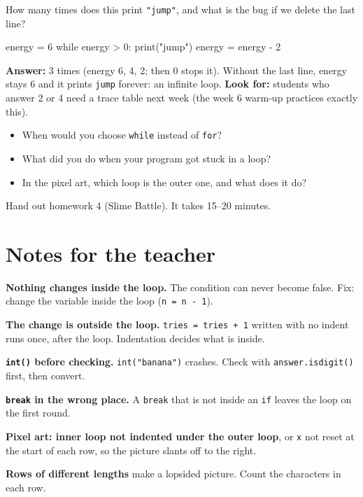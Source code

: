 \begin{formativecheck}
How many times does this print \texttt{"jump"}, and what is the bug if we delete the last line?
\begin{pycode}
energy = 6
while energy > 0:
    print("jump")
    energy = energy - 2
\end{pycode}
\textbf{Answer:} 3 times (energy 6, 4, 2; then 0 stops it). Without the last line, energy stays 6 and it prints \texttt{jump} forever: an infinite loop.
\textbf{Look for:} students who answer 2 or 4 need a trace table next week (the week 6 warm-up practices exactly this).
\end{formativecheck}

\begin{reflection}
\begin{itemize}[leftmargin=1.2em]
  \item When would you choose \texttt{while} instead of \texttt{for}?
  \item What did you do when your program got stuck in a loop?
  \item In the pixel art, which loop is the outer one, and what does it do?
\end{itemize}
\end{reflection}
Hand out homework 4 (Slime Battle). It takes 15--20 minutes.

\section{Notes for the teacher}
\begin{commonmistakes}
  \item \textbf{Nothing changes inside the loop.} The condition can never become false. Fix: change the variable inside the loop (\texttt{n = n - 1}).
  \item \textbf{The change is outside the loop.} \texttt{tries = tries + 1} written with no indent runs once, after the loop. Indentation decides what is inside.
  \item \textbf{\texttt{int()} before checking.} \texttt{int("banana")} crashes. Check with \texttt{answer.isdigit()} first, then convert.
  \item \textbf{\texttt{break} in the wrong place.} A \texttt{break} that is not inside an \texttt{if} leaves the loop on the first round.
  \item \textbf{Pixel art: inner loop not indented under the outer loop}, or \texttt{x} not reset at the start of each row, so the picture slants off to the right.
  \item \textbf{Rows of different lengths} make a lopsided picture. Count the characters in each row.
\end{commonmistakes}

